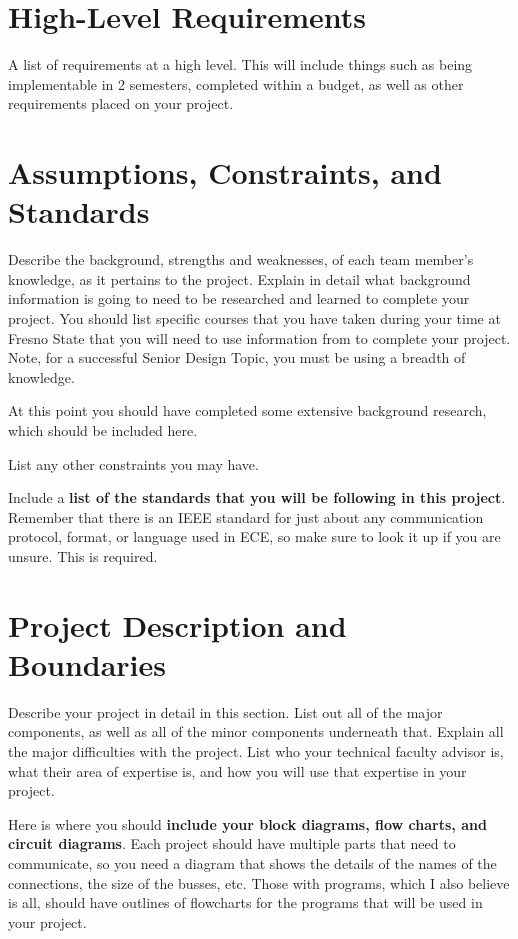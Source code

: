  \section{High-Level Requirements}
 A list of requirements at a high level.  This will include things such as being implementable in 2 semesters, completed within a budget, as well
 as other requirements placed on your project.
 
\section{Assumptions, Constraints, and Standards}
Describe the background, strengths and weaknesses, of each
team member's knowledge, as it pertains to the project.  Explain in detail what background information is going to need to be researched
and learned to complete your project.  You should list specific courses that you have taken during your time at Fresno State that you will need to 
use information from to complete your project.  Note, for a successful Senior Design Topic, you must be using a breadth of knowledge.

At this point you should have completed some extensive background research, which should be included here.

List any other constraints you may have.

Include a \textbf{list of the standards that you will be following in this project}.  Remember that there is an
IEEE standard for just about any communication protocol, format, or language used in ECE, so make sure to
look it up if you are unsure.  This is required.
 
\section{Project Description and Boundaries}
Describe your project in detail in this section.  List out all of the major components, as well as all of the minor components underneath that.
Explain all the major difficulties with the project.  
List who your technical faculty advisor is, what their area of expertise is, and how
you will use that expertise in your project.

Here is where you should \textbf{include your block diagrams, flow charts, and circuit diagrams}.
Each project should have multiple parts that need to communicate, so you need a diagram that shows the details
of the names of the connections, the size of the busses, etc.  Those with programs, which I also believe is all,
should have outlines of flowcharts for the programs that will be used in your project.

